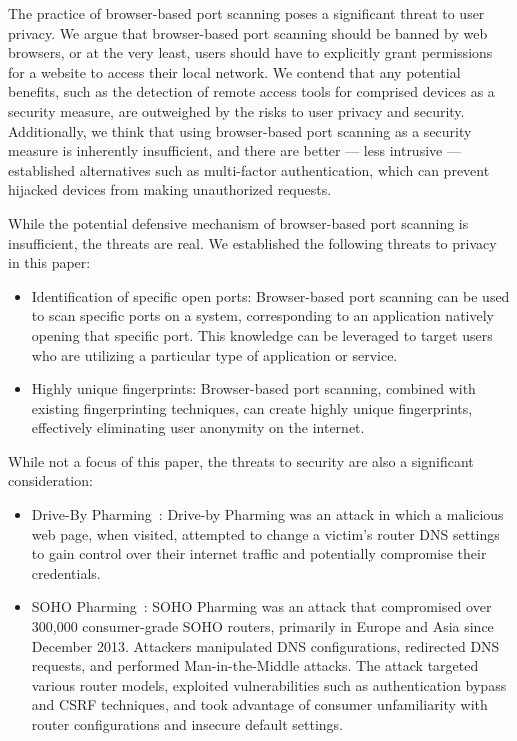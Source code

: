 The practice of browser-based port scanning poses a significant threat to user privacy. We argue that browser-based port scanning should be banned by web browsers, or at the very least, users should have to explicitly grant permissions for a website to access their local network. 
We contend that any potential benefits, such as the detection of remote access tools for comprised devices as a security measure, are outweighed by the risks to user privacy and security.
Additionally, we think that using browser-based port scanning as a security measure is inherently insufficient, and there are better --- less intrusive --- established alternatives such as multi-factor authentication, which can prevent hijacked devices from making unauthorized requests.

While the potential defensive mechanism of browser-based port scanning is insufficient, the threats are real.
We established the following threats to privacy in this paper:
\begin{itemize}
    \item Identification of specific open ports: Browser-based port scanning can be used to scan specific ports on a system, corresponding to an application natively opening that specific port. This knowledge can be leveraged to target users who are utilizing a particular type of application or service.
    \item Highly unique fingerprints: Browser-based port scanning, combined with existing fingerprinting techniques, can create highly unique fingerprints, effectively eliminating user anonymity on the internet.
\end{itemize}

While not a focus of this paper, the threats to security are also a significant consideration:
\begin{itemize}
    \item Drive-By Pharming~: Drive-by Pharming was an attack in which a malicious web page, when visited, attempted to change a victim's router DNS settings to gain control over their internet traffic and potentially compromise their credentials.
    \item SOHO Pharming~: SOHO Pharming was an attack that compromised over 300,000 consumer-grade SOHO routers, primarily in Europe and Asia since December 2013. Attackers manipulated DNS configurations, redirected DNS requests, and performed Man-in-the-Middle attacks. The attack targeted various router models, exploited vulnerabilities such as authentication bypass and CSRF techniques, and took advantage of consumer unfamiliarity with router configurations and insecure default settings.
\end{itemize}

